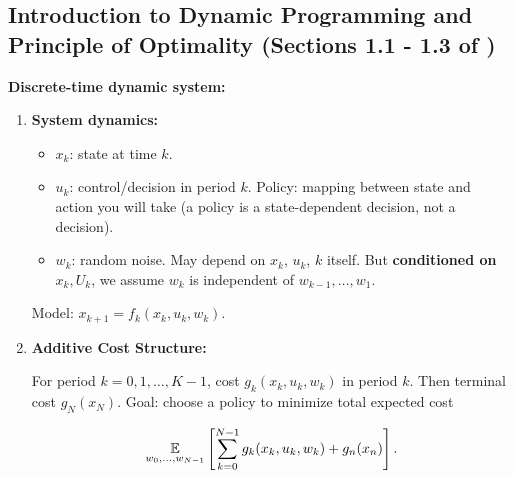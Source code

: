 \subsection{Introduction to Dynamic Programming and Principle of Optimality (Sections 1.1 - 1.3 of \citep{v1_bertsekas2012dynamic} )}

\textbf{Discrete-time dynamic system:}

\begin{enumerate}

\item \textbf{System dynamics:}

\begin{itemize}

\item \(x_k\): state at time \(k\).

\item \(u_k\): control/decision in period \(k\). Policy: mapping between state and action you will take (a policy is a state-dependent decision, not a decision).

\item \(w_k\): random noise. May depend on \(x_k\), \(u_k\), \(k\) itself. But \textbf{conditioned on \(x_k, U_k\)}, we assume \(w_k\) is independent of \(w_{k-1}, \ldots, w_1\).

\end{itemize}

Model: \(x_{k+1} = f_k(x_k, u_k, w_k)\). 

\item \textbf{Additive Cost Structure:}

For period \(k = 0, 1, \ldots, K-1\), cost \(g_k(x_k, u_k, w_k)\) in period \(k\). Then terminal cost \(g_N(x_N)\). Goal: choose a policy to minimize total expected cost

\[
\underset{w_0, \ldots, w_{N-1}}{\mathbb{E}} \left[  \sum_{k=0}^{N-1} g_k(x_k, u_k, w_k) + g_n(x_n)\right].
\]

\end{enumerate}

